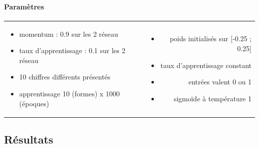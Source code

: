 \documentclass[a4paper,12pt]{article}
\begin{document}
      \paragraph*{Paramètres}
        \begin{center}
	  \begin{tabular}{lr}
	    \begin{minipage}{220px}
	      \begin{itemize}
		\item momentum : 0.9 sur les 2 réseau
		\item taux d'apprentissage : 0.1 sur les 2 réseau
		\item 10 chiffres différents présentés
		\item apprentissage 10 (formes) x 1000 (époques)
	      \end{itemize}
	    \end{minipage}
	    &
	    \begin{minipage}{205px}
	      \begin{itemize}
		\item poids initialisés sur [-0.25 ; 0.25]
		\item taux d'apprentissage constant
		\item entrées valent 0 ou 1
		\item sigmoïde à température 1
	      \end{itemize}
	    \end{minipage}
	  \end{tabular}
	\end{center}

    
    \newpage
    \subsection*{Résultats}
\end{document}
